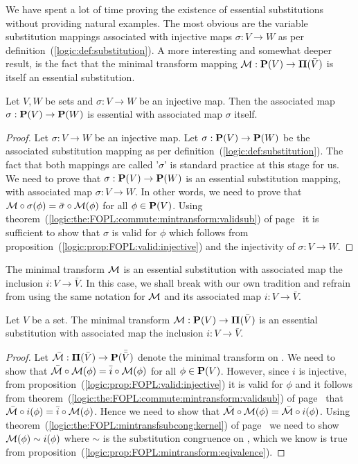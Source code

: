 We have spent a lot of time proving the existence of essential
substitutions without providing natural examples. The most obvious
are the variable substitution mappings associated with injective
maps $\sigma:V\to W$ as per
definition~(\ref{logic:def:substitution}). A more interesting and
somewhat deeper result, is the fact that the minimal transform
mapping ${\cal M}:\mbox{${\bf P}(V)$}\to\mbox{${\bf\Pi}(\bar{V})$}$ is itself an essential substitution.

\begin{prop}\label{logic:prop:FOPL:esssubstprop:injective}
Let $V,W$ be sets and $\sigma:V\to W$ be an injective map. Then the
associated map $\sigma:\mbox{${\bf P}(V)$}\to{\bf P}(W)$ is essential with
associated map $\sigma$ itself.
\end{prop}
\begin{proof}
Let $\sigma:V\to W$ be an injective map. Let $\sigma:\mbox{${\bf P}(V)$}\to{\bf
P}(W)$ be the associated substitution mapping as per
definition~(\ref{logic:def:substitution}). The fact that both
mappings are called '$\sigma$' is standard practice at this stage
for us. We need to prove that $\sigma:\mbox{${\bf P}(V)$}\to{\bf P}(W)$ is an
essential substitution mapping, with associated map $\sigma:V\to W$.
In other words, we need to prove that ${\cal
M}\circ\sigma(\phi)=\bar{\sigma}\circ{\cal M}(\phi)$ for all
$\phi\in\mbox{${\bf P}(V)$}$. Using
theorem~(\ref{logic:the:FOPL:commute:mintransform:validsub}) of
page~\pageref{logic:the:FOPL:commute:mintransform:validsub} it is
sufficient to show that $\sigma$ is valid for $\phi$ which follows
from proposition~(\ref{logic:prop:FOPL:valid:injective}) and the
injectivity of $\sigma:V\to W$.
\end{proof}

The minimal transform ${\cal M}$ is an essential substitution with
associated map the inclusion $i:V\to\bar{V}$. In this case, we shall
break with our own tradition and refrain from using the same
notation for ${\cal M}$ and its associated map $i:V\to\bar{V}$.
\begin{prop}\label{logic:prop:FOPL:esssubstprop:mintransform}
Let $V$ be a set. The minimal transform ${\cal M}:\mbox{${\bf P}(V)$}\to\mbox{${\bf\Pi}(\bar{V})$}$ is an
essential substitution with associated map the inclusion
$i:V\to\bar{V}$.
\end{prop}
\begin{proof}
Let $\bar{\cal M}:\mbox{${\bf\Pi}(\bar{V})$}\to{\bf P}(\bar{\bar{V}})$ denote the minimal
transform on \pvb. We need to show that $\bar{\cal M}\circ{\cal
M}(\phi)=\bar{i}\circ{\cal M}(\phi)$ for all $\phi\in\mbox{${\bf P}(V)$}$. However,
since $i$ is injective, from
proposition~(\ref{logic:prop:FOPL:valid:injective}) it is valid for
$\phi$ and it follows from
theorem~(\ref{logic:the:FOPL:commute:mintransform:validsub}) of
page~\pageref{logic:the:FOPL:commute:mintransform:validsub} that
$\bar{\cal M}\circ i(\phi)=\bar{i}\circ{\cal M}(\phi)$. Hence we
need to show that $\bar{\cal M}\circ{\cal M}(\phi)=\bar{\cal M}\circ
i(\phi)$. Using
theorem~(\ref{logic:the:FOPL:mintransfsubcong:kernel}) of
page~\pageref{logic:the:FOPL:mintransfsubcong:kernel} we need to
show ${\cal M}(\phi)\sim i(\phi)$ where $\sim$ is the substitution
congruence on \pvb, which we know is true from
proposition~(\ref{logic:prop:FOPL:mintransform:eqivalence}).
\end{proof}

